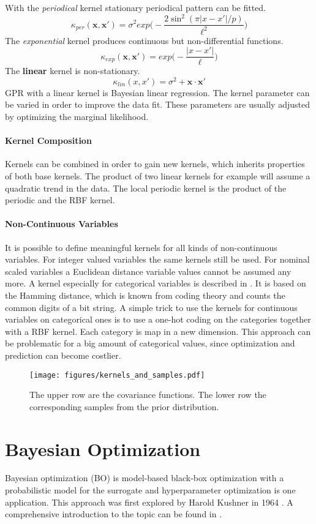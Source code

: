 \documentclass[english]{article}
\newcommand{\x}{\mathbf{x}}
\begin{document}
With the \textit{periodical} kernel stationary periodical pattern can be fitted.
$$\kappa_{per}(\x,\x') = \sigma^2exp\bigg(-\frac{2 \sin^2(\pi|x-x'|/p)}{\ell^2}\bigg)$$
The \textit{exponential} kernel produces continuous but non-differential functions.
$$\kappa_{exp}(\x,\x') = exp\bigg(-\frac{|x-x'|}{\ell}\bigg)$$
The \textbf{linear} kernel is non-stationary.
$$\kappa_{lin}(x, x') = \sigma^2 + \x\cdot\x'$$
GPR with a linear kernel is Bayesian linear regression.
The kernel parameter can be varied in order to improve the data fit. These parameters are usually adjusted by optimizing the marginal likelihood.

\paragraph{Kernel Composition}
Kernels can be combined in order to gain new kernels, which inherits properties of both base kernels. The product of two linear kernels for example will assume a quadratic trend in the data. The local periodic kernel is the product of the periodic and the RBF kernel.

\paragraph{Non-Continuous Variables}
It is possible to define meaningful kernels for all kinds of  non-continuous variables. For integer valued variables the same kernels still be used. For nominal scaled variables a Euclidean distance variable values cannot be assumed any more. A kernel especially for categorical variables is described in \cite{hutter_sequential_2011}. It is based on the Hamming distance, which is known from coding theory and counts the common digits of a bit string. A simple trick to use the kernels for continuous variables on categorical ones is to use a one-hot coding on the categories together with a RBF kernel. Each category is map in a new dimension. This approach can be problematic for a big amount of categorical values, since optimization and prediction can become costlier.

\begin{figure}
  \texttt{[image: figures/kernels\_and\_samples.pdf]}
  \caption{The upper row are the covariance functions. The lower row the corresponding samples from the prior distribution.}
  \label{kernels}
\end{figure}

\newpage


\section{Bayesian Optimization}
Bayesian optimization (BO) is model-based black-box optimization with a probabilistic model for the surrogate and hyperparameter optimization is one application. This approach was first explored by Harold Kushner in 1964 \cite{kushner_new_1964}. A comprehensive introduction to the topic can be found in \cite{shahriari_taking_2016}.
\end{document}
